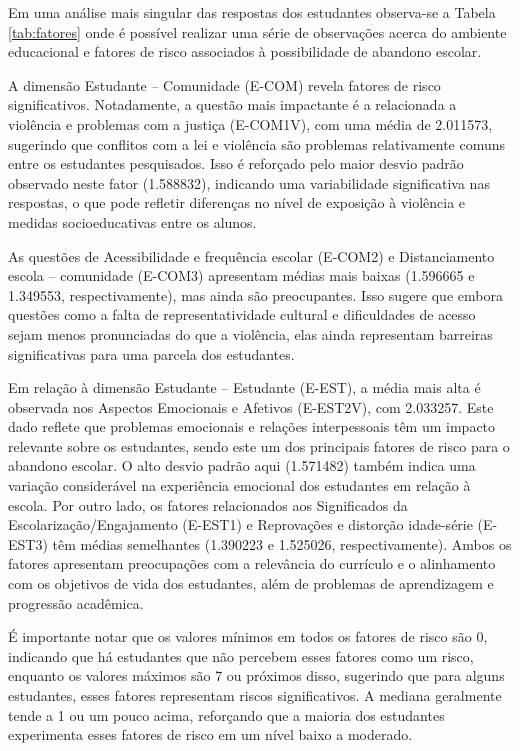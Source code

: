 Em uma análise mais singular das respostas dos estudantes observa-se a Tabela \ref{tab:fatores} onde é possível realizar uma série de observações acerca do ambiente educacional e fatores de risco associados à possibilidade de abandono escolar.

A dimensão Estudante – Comunidade (E-COM) revela fatores de risco significativos. Notadamente, a questão mais impactante é a relacionada a violência e problemas com a justiça (E-COM1V), com uma média de 2.011573, sugerindo que conflitos com a lei e violência são problemas relativamente comuns entre os estudantes pesquisados. Isso é reforçado pelo maior desvio padrão observado neste fator (1.588832), indicando uma variabilidade significativa nas respostas, o que pode refletir diferenças no nível de exposição à violência e medidas socioeducativas entre os alunos.

As questões de Acessibilidade e frequência escolar (E-COM2) e Distanciamento escola – comunidade (E-COM3) apresentam médias mais baixas (1.596665 e 1.349553, respectivamente), mas ainda são preocupantes. Isso sugere que embora questões como a falta de representatividade cultural e dificuldades de acesso sejam menos pronunciadas do que a violência, elas ainda representam barreiras significativas para uma parcela dos estudantes.

Em relação à dimensão Estudante – Estudante (E-EST), a média mais alta é observada nos Aspectos Emocionais e Afetivos (E-EST2V), com 2.033257. Este dado reflete que problemas emocionais e relações interpessoais têm um impacto relevante sobre os estudantes, sendo este um dos principais fatores de risco para o abandono escolar. O alto desvio padrão aqui (1.571482) também indica uma variação considerável na experiência emocional dos estudantes em relação à escola. Por outro lado, os fatores relacionados aos Significados da Escolarização/Engajamento (E-EST1) e Reprovações e distorção idade-série (E-EST3) têm médias semelhantes (1.390223 e 1.525026, respectivamente). Ambos os fatores apresentam preocupações com a relevância do currículo e o alinhamento com os objetivos de vida dos estudantes, além de problemas de aprendizagem e progressão acadêmica.

É importante notar que os valores mínimos em todos os fatores de risco são 0, indicando que há estudantes que não percebem esses fatores como um risco, enquanto os valores máximos são 7 ou próximos disso, sugerindo que para alguns estudantes, esses fatores representam riscos significativos. A mediana geralmente tende a 1 ou um pouco acima, reforçando que a maioria dos estudantes experimenta esses fatores de risco em um nível baixo a moderado.

